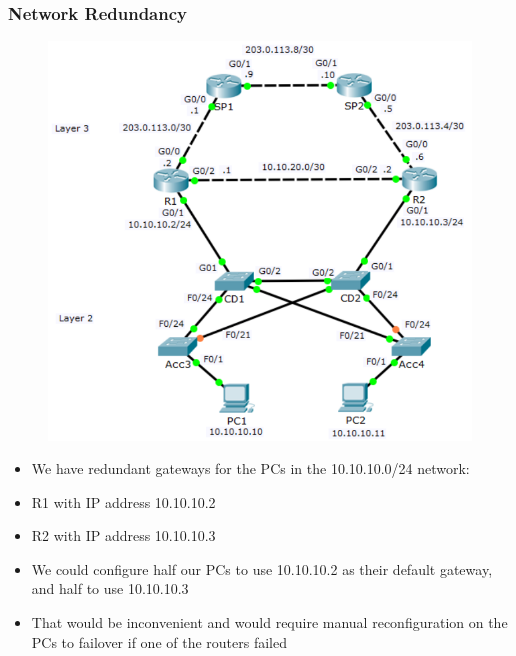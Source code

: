 \documentclass[pdflatex,compress,mathserif]{beamer}
\begin{document}
\begin{frame}
	\frametitle{Network Redundancy}
	\begin{multicols}{2}
		\begin{figure}
			\centering
			\includegraphics[width=\linewidth]{img/img09}
		\end{figure}
		\columnbreak
		\begin{itemize}
			\item We have redundant gateways for the PCs
in the 10.10.10.0/24 network:
			\item R1 with IP address 10.10.10.2
			\item R2 with IP address 10.10.10.3
			\item We could configure half our PCs to use
10.10.10.2 as their default gateway, and
half to use 10.10.10.3
			\item That would be inconvenient and would
require manual reconfiguration on the
PCs to failover if one of the routers failed
		\end{itemize}
	\end{multicols}
\end{frame}
\end{document}
